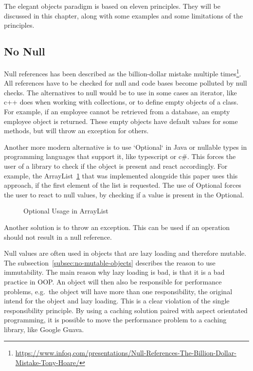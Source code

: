 The elegant objects paradigm is based on eleven principles.
They will be discussed in this chapter, along with some examples and some limitations of the principles.

\subsection{No Null}\label{subsec:no-null}
Null references has been described as the billion-dollar mistake multiple times\footnote{\url{https://www.infoq.com/presentations/Null-References-The-Billion-Dollar-Mistake-Tony-Hoare/}}.
All references have to be checked for null and code bases become polluted by null checks.
The alternatives to null would be to use in some cases an iterator, like c++ does when working with collections, or to define empty objects of a class.
For example, if an employee cannot be retrieved from a database, an empty employee object is returned.
These empty objects have default values for some methods, but will throw an exception for others.

Another more modern alternative is to use `Optional` in Java or nullable types in programming languages that support it, like typescript or c\#.
This forces the user of a library to check if the object is present and react accordingly.
For example, the ArrayList\ \ref{fig:optional-usage} that was implemented alongside this paper uses this approach, if the first element of the list is requested.
The use of Optional forces the user to react to null values, by checking if a value is present in the Optional.

\begin{figure}[h]
    \caption{Optional Usage in ArrayList}
    
    \label{fig:optional-usage}
\end{figure}

Another solution is to throw an exception.
This can be used if an operation should not result in a null reference.

Null values are often used in objects that are lazy loading and therefore mutable.
The subsection\ \ref{subsec:no-mutable-objects} describes the reason to use immutability.
The main reason why lazy loading is bad, is that it is a bad practice in \gls{OOP}.
An object will then also be responsible for performance problems, e.g.\ the object will have more than one responsibility,
the original intend for the object and lazy loading.
This is a clear violation of the single responsibility principle.
By using a caching solution paired with aspect orientated programming, it is possible to move the performance problem to a caching library, like Google Guava.\cite{elegant-objects}

